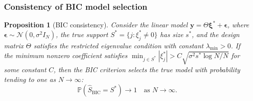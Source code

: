 \documentclass[preprint,12pt]{elsarticle}
\newtheorem{proposition}{Proposition}
\begin{document}
\subsubsection{Consistency of BIC model selection}

\begin{proposition}[BIC consistency]
\label{prop:bic}
Consider the linear model $\mathbf{y} = \Theta \boldsymbol{\xi}^* + \boldsymbol{\epsilon}$, where $\boldsymbol{\epsilon} \sim \mathcal{N}(0,\sigma^2 I_N)$, the true support $S^* = \{j: \xi_j^* \neq 0\}$ has size $s^*$, and the design matrix $\Theta$ satisfies the restricted eigenvalue condition with constant $\lambda_{\min} > 0$. If the minimum nonzero coefficient satisfies $\min_{j \in S^*} |\xi_j^*| > C \sqrt{\sigma^2 s^* \log N / N}$ for some constant $C$, then the BIC criterion selects the true model with probability tending to one as $N \to \infty$:
\begin{equation}
\mathbb{P}(\hat{S}_{\mathrm{BIC}} = S^*) \to 1 \quad \text{as } N \to \infty.
\end{equation}
\end{proposition}
\end{document}
